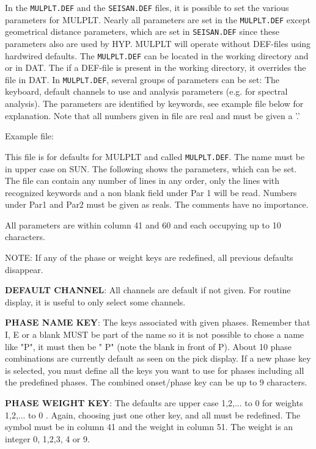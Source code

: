 In the \texttt{MULPLT.DEF} and the \texttt{SEISAN.DEF} files, it is possible to set the various parameters for MULPLT. Nearly all parameters are set in the \texttt{MULPLT.DEF} except geometrical distance parameters, which are set in \texttt{SEISAN.DEF} since these parameters also are used by HYP. MULPLT will operate without DEF-files using hardwired defaults. The \texttt{MULPLT.DEF} can be located in the working directory and or in DAT. The if a DEF-file is present in the working directory, it overrides the file in DAT. In \texttt{MULPLT.DEF}, several groups of parameters can be set: The keyboard, default channels to use and analysis parameters (e.g. for spectral analysis). The parameters are identified by keywords, see example file below for explanation.
Note that all numbers given in file are real and must be given a '.'

Example file: 

This file is for defaults for MULPLT and called \texttt{MULPLT.DEF}. 
The name must be in upper case on SUN. The following shows the parameters, 
which can be set. The file can contain any number of lines in any order, 
only the lines with recognized keywords and a non blank field under 
Par 1 will be read. 
Numbers under Par1 and Par2 must be given as reals.
The comments have no importance. 

%


All parameters are within column 41 and 60 and each occupying up to 10 characters. 

NOTE: If any of the phase or weight keys are redefined, all previous defaults disappear. 

\textbf{DEFAULT CHANNEL}: All channels are default if not given. For routine display, it is useful to only select some channels. 

\textbf{PHASE NAME KEY}: The keys associated with given phases. Remember that I, E or a blank MUST be part of the name so it is not possible to chose a name like "P", it must then be " P" (note the blank in front of P). About 10 phase combinations are currently default as seen on the pick display. If a new phase key is selected, you must define all the keys you want to use for phases including all the predefined phases. The combined onset/phase key can be up to 9 characters. 

\textbf{PHASE WEIGHT KEY}: The defaults are upper 
case 1,2,... to 0 for weights 1,2,... to 0 . Again, choosing just one other 
key, and all must be redefined. The symbol must be in column 41 and the 
weight in column 51. The weight is an integer 0, 1,2,3, 4 or 9. 

